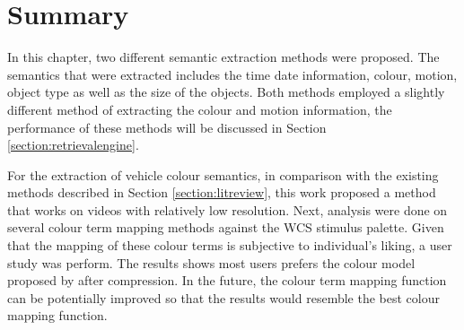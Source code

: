 \section{Summary}
In this chapter, two different semantic extraction methods were proposed. The semantics that were extracted includes the time date information, colour, motion, object type as well as the size of the objects. Both methods employed a slightly different method of extracting the colour and motion information, the performance of these methods will be discussed in Section \ref{section:retrievalengine}.

For the extraction of vehicle colour semantics, in comparison with the existing methods described in Section \ref{section:litreview}, this work proposed a method that works on videos with relatively low resolution. Next, analysis were done on several colour term mapping methods against the WCS stimulus palette. Given that the mapping of these colour terms is subjective to individual's liking, a user study was perform. The results shows most users prefers the colour model proposed by  after compression.
In the future, the colour term mapping function can be potentially improved so that the results would resemble the best colour mapping function.

